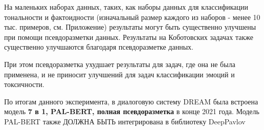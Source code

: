 На маленьких наборах данных, таких, как наборы данных для классификации тональности и фактоидности (изначальный размер каждого из наборов - менее 10 тыс. примеров, см. Приложение) результаты могут быть существенно улучшены при помощи псевдоразметки данных. Результаты на Коботовских задачах также существенно улучшаются благодаря псевдоразметке данных.

При этом псевдоразметка ухудшает результаты для задач, где она не была применена, и не приносит улучшений для задач классификации эмоций и токсичности.

По итогам данного эксперимента, в диалоговую систему DREAM была встроена модель \textbf{7 в 1, PAL-BERT, полная псевдоразметка} в конце 2021 года. Модель PAL-BERT также ДОЛЖНА БЫТЬ интегрирована в библиотеку DeepPavlov
